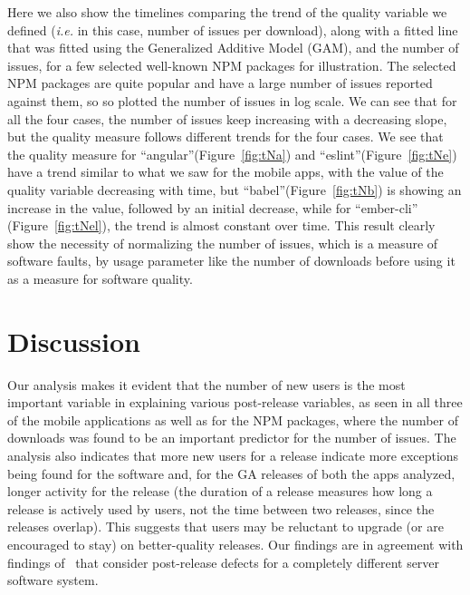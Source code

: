 \documentclass[smallcondensed]{svjour3}     %
\begin{document}
Here we also show the timelines comparing the trend of the quality variable we defined (\emph{i.e.} in this case, number of issues per download), along with a fitted line that was fitted using the Generalized Additive Model (GAM), and the number of issues, for a few selected well-known NPM packages for illustration. 
The selected NPM packages are quite popular and have a large number of issues reported against them, so so plotted the number of issues in log scale. We can see that for all the four cases, the number of issues keep increasing with a decreasing slope, but the quality measure follows different trends for the four cases.
We see that the quality measure for ``angular''(Figure~\ref{fig:tNa}) and ``eslint''(Figure~\ref{fig:tNe}) have a trend similar to what we saw for the mobile apps, with the value of the quality variable decreasing with time, but ``babel''(Figure~\ref{fig:tNb}) is showing an increase in the value, followed by an initial decrease, while for ``ember-cli'' (Figure~\ref{fig:tNel}), the trend is almost constant over time.
This result clearly show the necessity of normalizing the number of issues, which is a measure of software faults, by usage parameter like the number of downloads before using it as a measure for software quality.




\vspace{-10pt}
\section{Discussion}\label{s:implication}

Our analysis makes it evident that the number of new
users  is the most important variable in explaining various post-release variables, as seen in all three of the mobile applications as well as for the NPM packages, where the number of downloads was found to be an important predictor for the number of issues. 
The analysis also indicates that more new users for a release indicate 
more exceptions being found for the software
and, for the GA releases of both the apps analyzed, longer activity for the release (the duration
of a release measures how long a release is actively used by users,
not the time between two releases, since the releases overlap).  This
suggests that users  may be reluctant to upgrade (or are encouraged to stay) on better-quality releases.
 Our findings are in agreement with findings
of~\cite{IQ08,hmps15,mockus2005predictors} that consider 
post-release defects for a completely different server software system.
\end{document}
